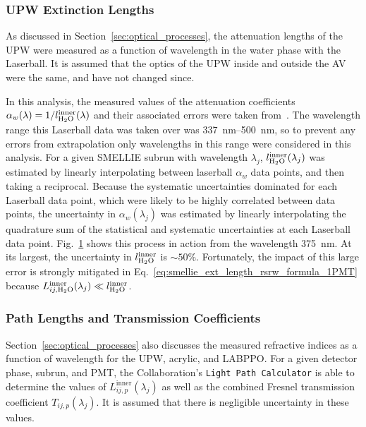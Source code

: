 \subsubsection{UPW Extinction Lengths}
As discussed in Section~\ref{sec:optical_processes}, the attenuation lengths of the UPW were measured as a function of wavelength in the water phase with the Laserball. It is assumed that the optics of the UPW inside and outside the AV were the same, and have not changed since.

In this analysis, the measured values of the attenuation coefficients $\alpha_{w}(\lambda) = 1/l_{\ce{H_{2}O}}^{\mathrm{inner}}(\lambda)$ and their associated errors were taken from~\cite{andersonOpticalCalibrationSNO2021}. The wavelength range this Laserball data was taken over was \SIrange{337}{500}{\nm}, so to prevent any errors from extrapolation only wavelengths in this range were considered in this analysis. For a given SMELLIE subrun with wavelength $\lambda_{j}$, $l_{\ce{H_{2}O}}^{\mathrm{inner}}(\lambda_{j})$ was estimated by linearly interpolating between laserball $\alpha_{w}$ data points, and then taking a reciprocal. Because the systematic uncertainties dominated for each Laserball data point, which were likely to be highly correlated between data points, the uncertainty in $\alpha_{w}(\lambda_{j})$ was estimated by linearly interpolating the quadrature sum of the statistical and systematic uncertainties at each Laserball data point. Fig.~\ref{fig:smellie_laserball_water_ext_length_est} shows this process in action from the wavelength \SI{375}{\nm}. At its largest, the uncertainty in $l_{\ce{H_{2}O}}^{\mathrm{inner}}$ is $\sim50\%$. Fortunately, the impact of this large error is strongly mitigated in Eq.~\ref{eq:smellie_ext_length_rsrw_formula_1PMT} because $L_{ij,\ce{H_{2}O}}^{\mathrm{inner}}(\lambda_{j})\ll l_{\ce{H_{2}O}}^{\mathrm{inner}}$.

\begin{figure}
    \centering
    \caption[]{}
    \label{fig:smellie_laserball_water_ext_length_est}
\end{figure}

\subsubsection{Path Lengths and Transmission Coefficients}
Section~\ref{sec:optical_processes} also discusses the measured refractive indices as a function of wavelength for the UPW, acrylic, and LABPPO. For a given detector phase, subrun, and PMT, the Collaboration's \texttt{Light Path Calculator} is able to determine the values of $L_{ij,p}^{\mathrm{inner}}(\lambda_{j})$ as well as the combined Fresnel transmission coefficient $T_{ij,p}(\lambda_{j})$. It is assumed that there is negligible uncertainty in these values.

